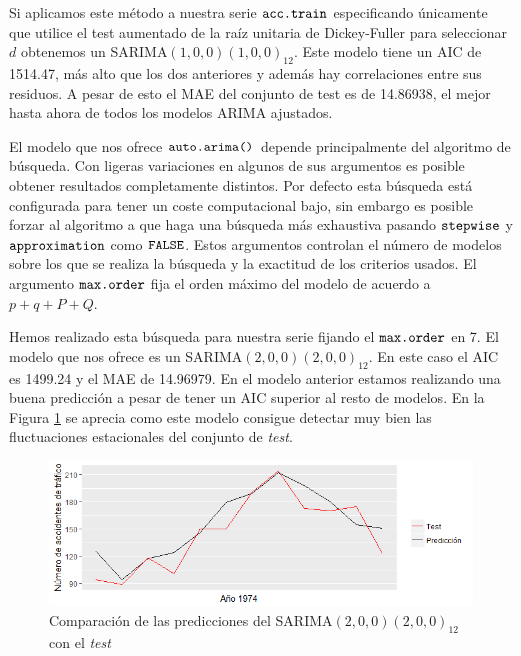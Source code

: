 Si aplicamos este método a nuestra serie $\verb!acc.train!$ especificando únicamente que utilice el test aumentado de la raíz unitaria de Dickey-Fuller para seleccionar $d$ obtenemos un SARIMA$(1,0,0)(1,0,0)_{12}$. Este modelo tiene un AIC de 1514.47, más alto que los dos anteriores y además hay correlaciones entre sus residuos. A pesar de esto el MAE del conjunto de test es de 14.86938, el mejor hasta ahora de todos los modelos  ARIMA ajustados.

El modelo que nos ofrece $\verb!auto.arima()!$ depende principalmente del algoritmo de búsqueda. Con ligeras variaciones en algunos de sus argumentos es posible obtener resultados completamente distintos. Por defecto esta búsqueda está configurada para tener un coste computacional bajo, sin embargo es posible forzar al algoritmo a que haga una búsqueda más exhaustiva pasando $\verb!stepwise!$ y $\verb!approximation!$ como $\verb!FALSE!$. Estos argumentos controlan el número de modelos sobre los que se realiza la búsqueda y la exactitud de los criterios usados. El argumento $\verb!max.order!$ fija el orden máximo del modelo de acuerdo a $p + q + P + Q$.

Hemos realizado esta búsqueda para nuestra serie fijando el $\verb!max.order!$ en 7. El modelo que nos ofrece es un SARIMA$(2,0,0)(2,0,0)_{12}$. En este caso el AIC es 1499.24 y el MAE de 14.96979. En el modelo anterior estamos realizando una buena predicción a pesar de tener un AIC superior al resto de modelos. En la Figura \ref{sarima_test} se aprecia como este modelo consigue detectar muy bien las fluctuaciones estacionales del conjunto de \textit{test}.
\begin{figure}
    \centering
    \centerline{\includegraphics[scale = 0.7]{Images/Modelizacion/321.png}}
    \caption{Comparación de las predicciones del SARIMA$(2,0,0)(2,0,0)_{12}$ con el \textit{test}}
    \label{sarima_test}
\end{figure}

